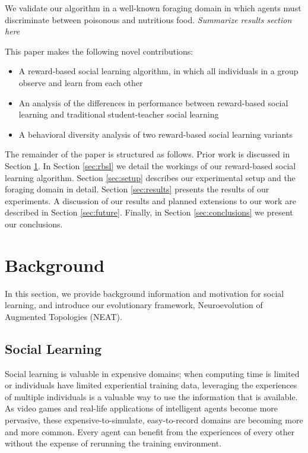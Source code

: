 \documentclass{acm_proc_article-sp}
\begin{document}
We validate our algorithm in a well-known foraging domain in which agents must discriminate between poisonous and nutritious food. \textit{Summarize results section here}

This paper makes the following novel contributions:
 
\begin{itemize}
\item A reward-based social learning algorithm, in which all individuals in a group observe and learn from each other
\item An analysis of the differences in performance between reward-based social learning and traditional student-teacher social learning
\item A behavioral diversity analysis of two reward-based social learning variants
\end{itemize}
 
The remainder of the paper is structured as follows.
Prior work is discussed in Section \ref{sec:background}.
In Section \ref{sec:rbsl} we detail the workings of our reward-based social learning algorithm.
Section \ref{sec:setup} describes our experimental setup and the foraging domain in detail.
Section \ref{sec:results} presents the results of our experiments.
A discussion of our results and planned extensions to our work are described in Section \ref{sec:future}.
Finally, in Section \ref{sec:conclusions} we present our conclusions.

\section{Background}
\label{sec:background}
In this section, we provide background information and motivation for social learning, and introduce our evolutionary framework, Neuroevolution of Augmented Topologies (NEAT).

\subsection*{Social Learning}

Social learning is valuable in expensive domains; when computing time is limited or individuals have limited experiential training data, leveraging the experiences of multiple individuals is a valuable way to use the information that is available. As video games and real-life applications of intelligent agents become more pervasive, these expensive-to-simulate, easy-to-record domains are becoming more and more common. Every agent can benefit from the experiences of every other without the expense of rerunning the training environment.
\end{document}
